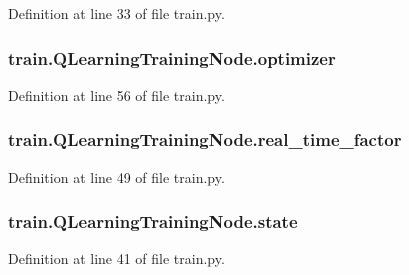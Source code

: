 Definition at line 33 of file train.\+py.

\subsubsection[{\texorpdfstring{optimizer}{optimizer}}]{\setlength{\rightskip}{0pt plus 5cm}train.\+Q\+Learning\+Training\+Node.\+optimizer}\hypertarget{classtrain_1_1_q_learning_training_node_a2cd6ba599812ec0edffba7869f4f27d9}{}\label{classtrain_1_1_q_learning_training_node_a2cd6ba599812ec0edffba7869f4f27d9}


Definition at line 56 of file train.\+py.

\subsubsection[{\texorpdfstring{real\+\_\+time\+\_\+factor}{real_time_factor}}]{\setlength{\rightskip}{0pt plus 5cm}train.\+Q\+Learning\+Training\+Node.\+real\+\_\+time\+\_\+factor}\hypertarget{classtrain_1_1_q_learning_training_node_a407532bec47855fec93201fa87fe80ab}{}\label{classtrain_1_1_q_learning_training_node_a407532bec47855fec93201fa87fe80ab}


Definition at line 49 of file train.\+py.

\subsubsection[{\texorpdfstring{state}{state}}]{\setlength{\rightskip}{0pt plus 5cm}train.\+Q\+Learning\+Training\+Node.\+state}\hypertarget{classtrain_1_1_q_learning_training_node_a6e860eb510dc030f536d26c2a3fcc33c}{}\label{classtrain_1_1_q_learning_training_node_a6e860eb510dc030f536d26c2a3fcc33c}


Definition at line 41 of file train.\+py.

